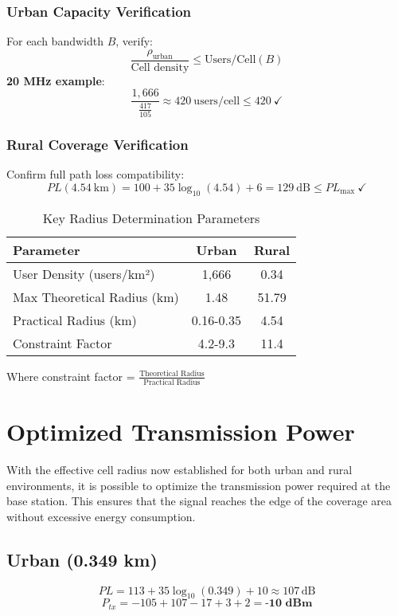 \documentclass[a4paper,12pt]{article}
\begin{document}
\subsubsection*{Urban Capacity Verification}
For each bandwidth $B$, verify:
\[
\frac{\rho_{\text{urban}}}{\text{Cell density}} \leq \text{Users/Cell}(B)
\]
\textbf{20 MHz example}:
\[
\frac{1,\!666}{\frac{417}{105}} \approx 420\ \text{users/cell} \leq 420\ \checkmark
\]

\subsubsection*{Rural Coverage Verification}
Confirm full path loss compatibility:
\[
PL(4.54\ \text{km}) = 100 + 35\log_{10}(4.54) + 6 = 129\ \text{dB} \leq PL_{\text{max}}\ \checkmark
\]

\begin{table}[h]
\centering
\caption{Key Radius Determination Parameters}
\label{tab:radius-params}
\begin{tabular}{lcc}
\toprule
Parameter & Urban & Rural \\
\midrule
User Density (users/km²) & 1,666 & 0.34 \\
Max Theoretical Radius (km) & 1.48 & 51.79 \\
Practical Radius (km) & 0.16-0.35 & 4.54 \\
Constraint Factor & 4.2-9.3 & 11.4 \\
\bottomrule
\end{tabular}
\end{table}

Where constraint factor = \(\frac{\text{Theoretical Radius}}{\text{Practical Radius}}\)

\section{Optimized Transmission Power}

With the effective cell radius now established for both urban and rural environments, it is possible to optimize the transmission power required at the base station. This ensures that the signal reaches the edge of the coverage area without excessive energy consumption.

\subsection*{Urban (0.349 km)}

\[ PL = 113 + 35\log_{10}(0.349) + 10 \approx 107\,\text{dB} \]
\[ P_{tx} = -105 + 107 - 17 + 3 + 2 = \textbf{-10 dBm} \]
\end{document}
